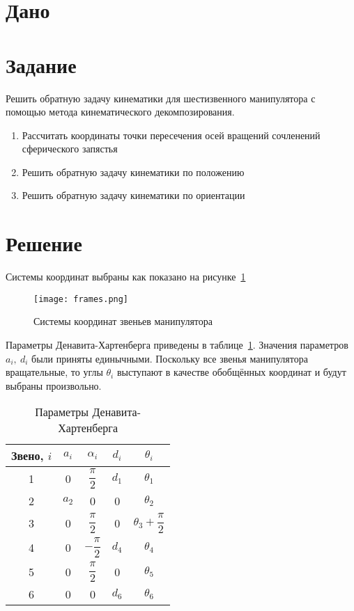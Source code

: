 \documentclass[14pt]{extarticle}
\begin{document}
    

    \section*{Дано}

    \section*{Задание}
    Решить обратную задачу кинематики для шестизвенного манипулятора с помощью метода кинематического декомпозирования.
    \begin{enumerate}
        \item Рассчитать координаты точки пересечения осей вращений сочленений сферического запястья
        \item Решить обратную задачу кинематики по положению
        \item Решить обратную задачу кинематики по ориентации
    \end{enumerate}

    \section*{Решение}
    Системы координат выбраны как показано на рисунке~\ref{pic:frames}
    \begin{figure}[H]
        \centering
        \texttt{[image: frames.png]}
        \caption{Системы координат звеньев манипулятора}
        \label{pic:frames}
    \end{figure}

    Параметры Денавита-Хартенберга приведены в таблице~\ref{tbl:params}.
    Значения параметров $a_i,\ d_i$ были приняты единычными. Поскольку все звенья манипулятора
    вращательные, то углы $\theta_i$ выступают в качестве обобщённых координат и будут выбраны произвольно.
    {
    \renewcommand{\arraystretch}{2}
    \begin{table}[H]
        \centering
        \begin{tabular}{*{5}{c}}\toprule
            Звено, $i$  & $a_i$ & $\alpha_i$        & $d_i$ & $\theta_i$ \\ [1ex] \midrule
            1           & 0     & $\dfrac{\pi}{2}$  & $d_1$ & $\theta_1$ \\ [1ex] \midrule
            2           & $a_2$ & 0                 & 0     & $\theta_2$ \\ [1ex] \midrule
            3           & 0     & $\dfrac{\pi}{2}$  & 0     & $\theta_3 + \dfrac{\pi}{2}$ \\ [1ex] \midrule
            4           & 0     & $-\dfrac{\pi}{2}$ & $d_4$ & $\theta_4$ \\ [1ex] \midrule
            5           & 0     & $\dfrac{\pi}{2}$  & 0     & $\theta_5$ \\ [1ex] \midrule
            6           & 0     & 0                 & $d_6$ & $\theta_6$ \\ [1ex]
            \bottomrule
        \end{tabular}
        \caption{Параметры Денавита-Хартенберга}
        \label{tbl:params}
    \end{table}
    }
\end{document}
